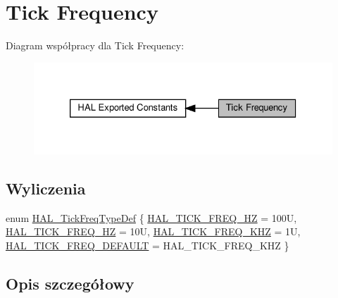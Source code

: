 \hypertarget{group___h_a_l___t_i_c_k___f_r_e_q}{}\section{Tick Frequency}
\label{group___h_a_l___t_i_c_k___f_r_e_q}
Diagram współpracy dla Tick Frequency\+:\nopagebreak
\begin{figure}[H]
\begin{center}
\leavevmode
\includegraphics[width=326pt]{group___h_a_l___t_i_c_k___f_r_e_q}
\end{center}
\end{figure}
\subsection*{Wyliczenia}
\begin{DoxyCompactItemize}
\item 
enum \hyperlink{group___h_a_l___t_i_c_k___f_r_e_q_gab36ec81674817249c46734772ff3b73a}{H\+A\+L\+\_\+\+Tick\+Freq\+Type\+Def} \{ \hyperlink{group___h_a_l___t_i_c_k___f_r_e_q_ggab36ec81674817249c46734772ff3b73aabf4d022d85adb437a57c1f45d6345092}{H\+A\+L\+\_\+\+T\+I\+C\+K\+\_\+\+F\+R\+E\+Q\+\_\+HZ} = 100U, 
\hyperlink{group___h_a_l___t_i_c_k___f_r_e_q_ggab36ec81674817249c46734772ff3b73aacb1ef3a0e9632aafe0fd162e2cd88408}{H\+A\+L\+\_\+\+T\+I\+C\+K\+\_\+\+F\+R\+E\+Q\+\_\+HZ} = 10U, 
\hyperlink{group___h_a_l___t_i_c_k___f_r_e_q_ggab36ec81674817249c46734772ff3b73aabef41c8ee13ca1d48eb49dac912f9689}{H\+A\+L\+\_\+\+T\+I\+C\+K\+\_\+\+F\+R\+E\+Q\+\_\+K\+HZ} = 1U, 
\hyperlink{group___h_a_l___t_i_c_k___f_r_e_q_ggab36ec81674817249c46734772ff3b73aa94e043d780eb1c36291338f6d6314e42}{H\+A\+L\+\_\+\+T\+I\+C\+K\+\_\+\+F\+R\+E\+Q\+\_\+\+D\+E\+F\+A\+U\+LT} = H\+A\+L\+\_\+\+T\+I\+C\+K\+\_\+\+F\+R\+E\+Q\+\_\+K\+HZ
 \}
\end{DoxyCompactItemize}


\subsection{Opis szczegółowy}


